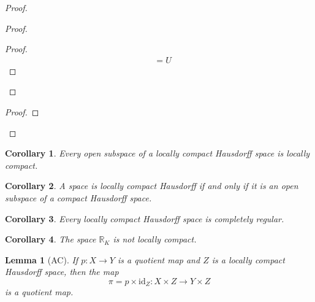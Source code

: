 \documentclass{report}
\let\qed\relax
\newtheorem{lm}{Lemma}[section]
\newtheorem{cor}{Corollary}[lm]
\theoremstyle{definition}
\newcommand{\id}[1]{\ensuremath{\mathrm{id}_{#1}}}
\begin{document}
\begin{proof}
\begin{proof}
\begin{proof}
\begin{align*}
          & = U
        \end{align*}
      \end{proof}
    \end{proof}
    \begin{proof}
    \end{proof}
    \qed
  \end{proof}

  \begin{cor}
    Every open subspace of a locally compact Hausdorff space is locally compact.
  \end{cor}

  \begin{cor}
    A space is locally compact Hausdorff if and only if it is an open subspace
    of a compact Hausdorff space.
  \end{cor}

  \begin{cor}
   Every locally compact Hausdorff space is completely regular.
  \end{cor}

  \begin{cor}
    The space $\mathbb{R}_K$ is not locally compact.
  \end{cor}

    \begin{lm}[AC]
      \label{lm:topology:locally_compact:quotient}
   If $p : X \rightarrow Y$ is a quotient map and $Z$ is a locally compact
Hausdorff space, then the map
\[ \pi = p \times \id{Z} : X \times Z \rightarrow Y \times Z \]
is a quotient map.
  \end{lm}
\end{document}
